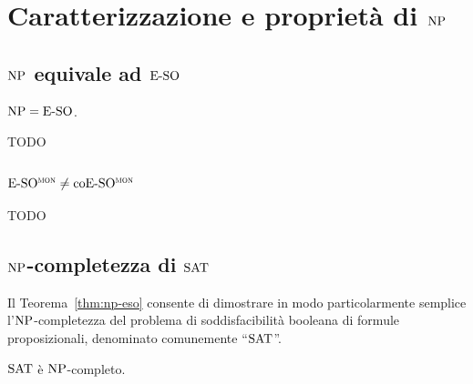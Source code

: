 \chapter{Caratterizzazione e proprietà di $\operatorname{NP}$}

\section{$\operatorname{NP}$ equivale ad $\operatorname{E-SO}$}

\begin{teorema}[Fagin]
  \label{thm:np-eso}
  $\operatorname{NP} = \operatorname{E-SO}$.
\end{teorema}


TODO


\section{$\operatorname{E-SO^{\normalfont\textsc{mon}}} \neq \operatorname{coE-SO^{\normalfont\textsc{mon}}}$}

TODO


\section{$\operatorname{NP}$-completezza di $\operatorname{SAT}$}

Il Teorema~\ref{thm:np-eso} consente di dimostrare in modo particolarmente semplice l'$\operatorname{NP}$-com\-ple\-tez\-za del problema di soddisfacibilità booleana di formule proposizionali, denominato comunemente ``$\operatorname{SAT}$''.

\begin{teorema}
  $\operatorname{SAT}$ è $\operatorname{NP}$-completo.
\end{teorema}

